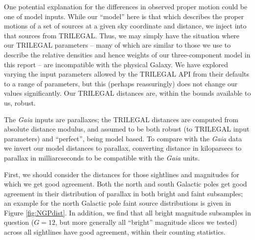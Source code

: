 \documentclass[fleqn,usenatbib]{mnras}
\begin{document}
One potential explanation for the differences in observed proper motion could be one of model inputs. While our ``model'' here is that which describes the proper motions of a set of sources at a given sky coordinate and distance, we inject into that sources from TRILEGAL. Thus, we may simply have the situation where our TRILEGAL parameters -- many of which are similar to those we use to describe the relative densities and hence weights of our three-component model in this report -- are incompatible with the physical Galaxy. We have explored varying the input parameters allowed by the TRILEGAL API from their defaults to a range of parameters, but this (perhaps reassuringly) does not change our values significantly. Our TRILEGAL distances are, within the bounds available to us, robust.

The \textit{Gaia} inputs are parallaxes; the TRILEGAL distances are computed from absolute distance modulus, and assumed to be both robust (to TRILEGAL input parameters) and ``perfect'', being model based. To compare with the \textit{Gaia} data we invert our model distances to parallax, converting distance in kiloparsecs to parallax in milliarcseconds to be compatible with the \textit{Gaia} units.

First, we should consider the distances for those sightlines and magnitudes for which we get good agreement. Both the north and south Galactic poles get good agreement in their distribution of parallax in both bright and faint subsamples; an example for the north Galactic pole faint source distributions is given in Figure \ref{fig:NGPdist}. In addition, we find that all bright magnitude subsamples in question ($G = 12$, but more generally all ``bright'' magnitude slices we tested) across all sightlines have good agreement, within their counting statistics.
\end{document}
